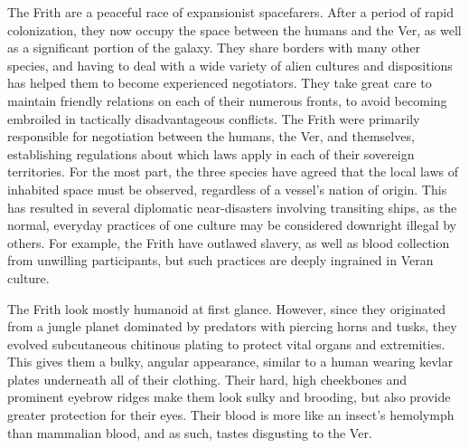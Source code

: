 \documentclass[blue]{guildcamp4}
\begin{document}
\name{\bFrith{}}

The Frith are a peaceful race of expansionist spacefarers. After a period of rapid colonization, they now occupy the space between the humans and the Ver, as well as a significant portion of the galaxy. They share borders with many other species, and having to deal with a wide variety of alien cultures and dispositions has helped them to become experienced negotiators. They take great care to maintain friendly relations on each of their numerous fronts, to avoid becoming embroiled in tactically disadvantageous conflicts. The Frith were primarily responsible for negotiation between the humans, the Ver, and themselves, establishing regulations about which laws apply in each of their sovereign territories. For the most part, the three species have agreed that the local laws of inhabited space must be observed, regardless of a vessel's nation of origin. This has resulted in several diplomatic near-disasters involving transiting ships, as the normal, everyday practices of one culture may be considered downright illegal by others. For example, the Frith have outlawed slavery, as well as blood collection from unwilling participants, but such practices are deeply ingrained in Veran culture.
	
The Frith look mostly humanoid at first glance. However, since they originated from a jungle planet dominated by predators with piercing horns and tusks, they evolved subcutaneous chitinous plating to protect vital organs and extremities. This gives them a bulky, angular appearance, similar to a human wearing kevlar plates underneath all of their clothing. Their hard, high cheekbones and prominent eyebrow ridges make them look sulky and brooding, but also provide greater protection for their eyes. Their blood is more like an insect's hemolymph than mammalian blood, and as such, tastes disgusting to the Ver.
\end{document}
